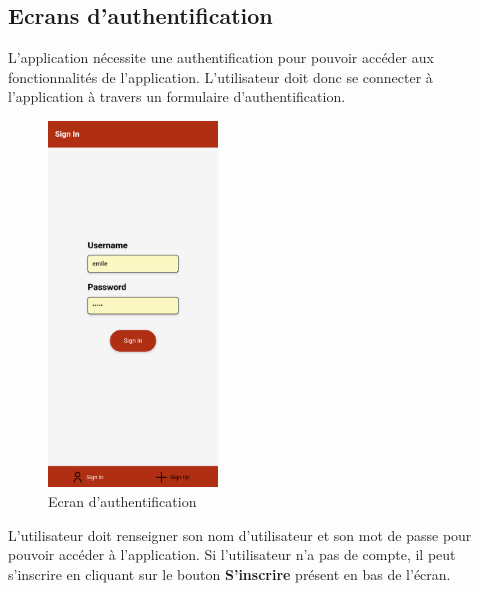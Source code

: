 \documentclass[12pt]{article}
\begin{document}
        \subsection{Ecrans d'authentification}{\label{subsec:auth}}
        L'application nécessite une authentification pour pouvoir accéder aux fonctionnalités de l'application.
        L'utilisateur doit donc se connecter à l'application à travers un formulaire d'authentification.\\
        \begin{figure}[H]
            \centering
            \includegraphics[width=0.4\textwidth]{images/signIn}
            \caption{Ecran d'authentification}
            \label{fig:auth}
        \end{figure}
        L'utilisateur doit renseigner son nom d'utilisateur et son mot de passe pour pouvoir accéder à l'application.
        Si l'utilisateur n'a pas de compte, il peut s'inscrire en cliquant sur le bouton \textbf{S'inscrire} présent
        en bas de l'écran.\\
\end{document}
